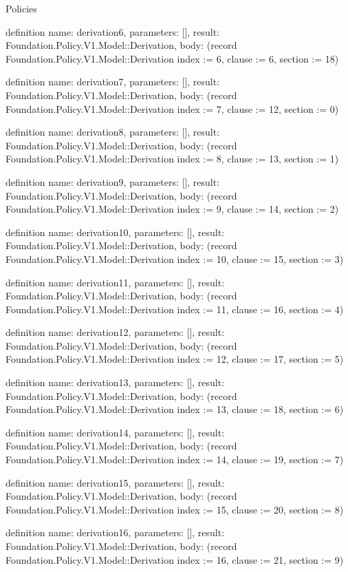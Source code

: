 \begin{lexlean}{Policies}
\begin{semanticmodule}
definition{
  name: derivation6,
  parameters: [],
  result: Foundation.Policy.V1.Model::Derivation,
  body: (record Foundation.Policy.V1.Model::Derivation {index := 6, clause := 6, section := 18})
}

definition{
  name: derivation7,
  parameters: [],
  result: Foundation.Policy.V1.Model::Derivation,
  body: (record Foundation.Policy.V1.Model::Derivation {index := 7, clause := 12, section := 0})
}

definition{
  name: derivation8,
  parameters: [],
  result: Foundation.Policy.V1.Model::Derivation,
  body: (record Foundation.Policy.V1.Model::Derivation {index := 8, clause := 13, section := 1})
}

definition{
  name: derivation9,
  parameters: [],
  result: Foundation.Policy.V1.Model::Derivation,
  body: (record Foundation.Policy.V1.Model::Derivation {index := 9, clause := 14, section := 2})
}

definition{
  name: derivation10,
  parameters: [],
  result: Foundation.Policy.V1.Model::Derivation,
  body: (record Foundation.Policy.V1.Model::Derivation {index := 10, clause := 15, section := 3})
}

definition{
  name: derivation11,
  parameters: [],
  result: Foundation.Policy.V1.Model::Derivation,
  body: (record Foundation.Policy.V1.Model::Derivation {index := 11, clause := 16, section := 4})
}

definition{
  name: derivation12,
  parameters: [],
  result: Foundation.Policy.V1.Model::Derivation,
  body: (record Foundation.Policy.V1.Model::Derivation {index := 12, clause := 17, section := 5})
}

definition{
  name: derivation13,
  parameters: [],
  result: Foundation.Policy.V1.Model::Derivation,
  body: (record Foundation.Policy.V1.Model::Derivation {index := 13, clause := 18, section := 6})
}

definition{
  name: derivation14,
  parameters: [],
  result: Foundation.Policy.V1.Model::Derivation,
  body: (record Foundation.Policy.V1.Model::Derivation {index := 14, clause := 19, section := 7})
}

definition{
  name: derivation15,
  parameters: [],
  result: Foundation.Policy.V1.Model::Derivation,
  body: (record Foundation.Policy.V1.Model::Derivation {index := 15, clause := 20, section := 8})
}

definition{
  name: derivation16,
  parameters: [],
  result: Foundation.Policy.V1.Model::Derivation,
  body: (record Foundation.Policy.V1.Model::Derivation {index := 16, clause := 21, section := 9})
}


\end{semanticmodule}
\end{lexlean}
